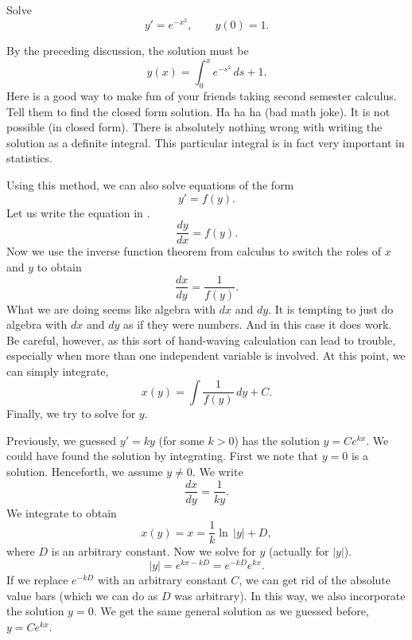 \begin{example}
Solve
\begin{equation*}
y' = e^{-x^2}, \qquad y(0) = 1 .
\end{equation*}

By the preceding discussion, the solution must be
\begin{equation*}
y(x) = \int_0^x e^{-s^2} \,ds + 1 .
\end{equation*}
Here is a good way to make fun of your friends taking second semester
calculus.  Tell them to
find the closed form solution.  Ha ha ha (bad math joke).  It is
not possible (in closed form).
There is absolutely nothing wrong with writing the solution as a
definite integral.
This particular integral
is in fact very important
in statistics.
\end{example}

Using this method, we can also solve equations of the form
\begin{equation*}
y' = f(y) .
\end{equation*}
Let us write the equation in .
\begin{equation*}
\frac{dy}{dx} = f(y) .
\end{equation*}
Now we use the inverse function theorem from calculus
to switch the roles of $x$ and $y$
to obtain
\begin{equation*}
\frac{dx}{dy} = \frac{1}{f(y)} .
\end{equation*}
What
we are doing seems like algebra with $dx$ and $dy$.
It is tempting to just do algebra with $dx$
and $dy$ as if they were numbers.  And in this case it does work.  Be
careful,
however, as this sort of hand-waving calculation can lead to trouble,
especially when
more than one independent variable is involved.
At this point, we can simply integrate,
\begin{equation*}
x(y) = \int \frac{1}{f(y)} \,dy + C .
\end{equation*}
Finally, we try to solve for $y$.

\begin{example}
Previously, we guessed $y' = ky$ (for some $k > 0$) has the solution
$y=Ce^{kx}$.  We could have found the solution by integrating.
First we note that $y=0$ is a solution.
Henceforth, we assume $y\not= 0$.  We write
\begin{equation*}
\frac{dx}{dy} = \frac{1}{ky} .
\end{equation*}
We integrate to obtain
\begin{equation*}
x(y) = x = \frac{1}{k} \ln \, \lvert y \rvert + D,
\end{equation*}
where $D$ is an arbitrary constant.
Now we solve for $y$ (actually for $\lvert y \rvert$).
\begin{equation*}
\lvert y \rvert =
e^{kx-kD} = 
e^{-kD} e^{k x} .
\end{equation*}
If we replace $e^{-kD}$ with an arbitrary constant $C$, we can
get rid of the absolute value bars (which we can do as $D$ was arbitrary).  In
this way, we
also incorporate the solution $y=0$.  We get the same general solution as
we guessed before, $y = Ce^{kx}$.
\end{example}

